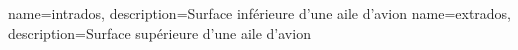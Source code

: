 {
    name=intrados,
    description={Surface inférieure d'une aile d'avion}
}
{
    name=extrados,
    description={Surface supérieure d'une aile d'avion}
}

